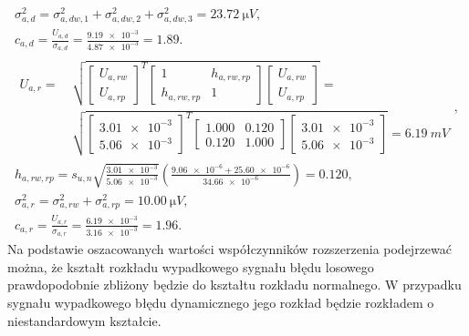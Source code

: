 \begin{gather}
\sigma_{a,d}^{2} = \sigma_{a,dw,1}^{2} + \sigma_{a,dw,2}^{2} + \sigma_{a,dw,3}^{2} = \qty{23.72}{\micro V} \label{eq:sym_parta_var_dyn}, \\
c_{a,d} = \frac{U_{a,d}}{\sigma_{a,d}} = \frac{\num{9.19e-3}}{\num{4.87e-3}} = \num{1.89} \label{eq:sym_parta_factor_dyn}. \\
\begin{split}
U_{a,r} =~
& \sqrt{
\begin{bmatrix}
U_{a,rw} \\ U_{a,rp}
\end{bmatrix}^{T}
\begin{bmatrix}
1           & h_{a,rw,rp} \\
h_{a,rw,rp} & 1
\end{bmatrix}
\begin{bmatrix}
U_{a,rw} \\ U_{a,rp}
\end{bmatrix}} =~\\
& \sqrt{
\begin{bmatrix}
\num{3.01e-3} \\ \num{5.06e-3}
\end{bmatrix}^{T}
\begin{bmatrix}
\num{1.000} & \num{0.120} \\
\num{0.120} & \num{1.000}
\end{bmatrix}
\begin{bmatrix}
\num{3.01e-3} \\ \num{5.06e-3}
\end{bmatrix}} = \qty{6.19}{mV}
\end{split}
\label{eq:sym_parta_uncert_rand}, \\
h_{a,rw,rp} = s_{u,n} \sqrt{\frac{\num{3.01e-3}}{\num{5.06e-3}}} \left( \frac{\num{9.06e-6} + \num{25.60e-6}}{\num{34.66e-6}} \right) = \num{0.120} \label{eq:sym_parta_coher_rw_rp}, \\
\sigma_{a,r}^{2} = \sigma_{a,rw}^{2} + \sigma_{a,rp}^{2} = \qty{10.00}{\micro V} \label{eq:sym_parta_var_rand}, \\
c_{a,r} = \frac{U_{a,r}}{\sigma_{a,r}} = \frac{\num{6.19e-3}}{\num{3.16e-3}} = \num{1.96} \label{eq:sym_parta_factor_rand}.
\end{gather}
Na podstawie oszacowanych wartości współczynników rozszerzenia podejrzewać można, że kształt rozkładu wypadkowego sygnału błędu losowego prawdopodobnie zbliżony będzie do kształtu rozkładu normalnego. W przypadku sygnału wypadkowego błędu dynamicznego jego rozkład będzie rozkładem o niestandardowym kształcie.

